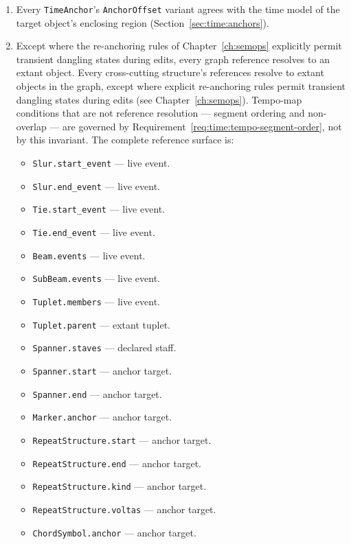 \documentclass[11pt,letterpaper]{report}
\newcounter{requirement}[chapter]
\begin{document}
\begin{requirement}
\begin{enumerate}
    \item Every \texttt{TimeAnchor}'s \texttt{AnchorOffset} variant
      agrees with the time model of the target object's enclosing
      region (Section~\ref{sec:time:anchors}).
    \item Except where the re-anchoring rules of
      Chapter~\ref{ch:semops} explicitly permit transient dangling
      states during edits, every graph reference resolves to an extant
      object. Every cross-cutting structure's references resolve to extant
      objects in the graph, except where explicit re-anchoring rules
      permit transient dangling states during edits (see
      Chapter~\ref{ch:semops}). Tempo-map conditions that are not
      reference resolution --- segment ordering and non-overlap --- are
      governed by Requirement~\ref{req:time:tempo-segment-order}, not by
      this invariant. The complete reference surface is:
      \begin{itemize}
        \item \texttt{Slur.start\_event} --- live event.
        \item \texttt{Slur.end\_event} --- live event.
        \item \texttt{Tie.start\_event} --- live event.
        \item \texttt{Tie.end\_event} --- live event.
        \item \texttt{Beam.events} --- live event.
        \item \texttt{SubBeam.events} --- live event.
        \item \texttt{Tuplet.members} --- live event.
        \item \texttt{Tuplet.parent} --- extant tuplet.
        \item \texttt{Spanner.staves} --- declared staff.
        \item \texttt{Spanner.start} --- anchor target.
        \item \texttt{Spanner.end} --- anchor target.
        \item \texttt{Marker.anchor} --- anchor target.
        \item \texttt{RepeatStructure.start} --- anchor target.
        \item \texttt{RepeatStructure.end} --- anchor target.
        \item \texttt{RepeatStructure.kind} --- anchor target.
        \item \texttt{RepeatStructure.voltas} --- anchor target.
        \item \texttt{ChordSymbol.anchor} --- anchor target.

\end{itemize}
\end{enumerate}
\end{requirement}
\end{document}
